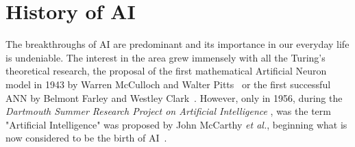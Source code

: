 \documentclass[class=report, crop=false, a4paper, 12pt]{standalone}
\begin{document}
\section{History of AI}



\par The breakthroughs of AI are predominant and its importance in our everyday life is undeniable. The interest in the area grew immensely with all the Turing's theoretical research, the proposal of the first mathematical Artificial Neuron model in 1943 by Warren McCulloch and Walter Pitts~\autocite{mccullochLOGICALCALCULUSIDEAS} or the first successful \gls{ANN} by Belmont Farley and Westley Clark~\autocite{farleySimulationSelforganizingSystems1954}. However, only in 1956, during the \textit{Dartmouth Summer Research Project on Artificial Intelligence} \autocite{mccarthyPROPOSALDARTMOUTHSUMMER}, was the term "Artificial Intelligence" was proposed by John McCarthy \textit{et al.}, beginning what is now considered to be the birth of AI~\autocite{zhangStudyArtificialIntelligence2021}.  
\end{document}

